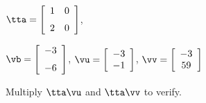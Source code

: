 {$\tta = \left[ \begin {array}{cc} 1&0\\ \noalign{\medskip}2&0 \end {array} \right] $, 

$\vb=\left[ \begin {array}{c} -3\\ \noalign{\medskip}-6 \end {array} \right] $, 
$\vu = \left[ \begin {array}{c} -3\\ -1 \end{array} \right]$, $\vv = \left[ \begin{array}{c} -3\\ 59 \end{array} \right] $}
{Multiply $\tta\vu$ and $\tta\vv$ to verify.}




